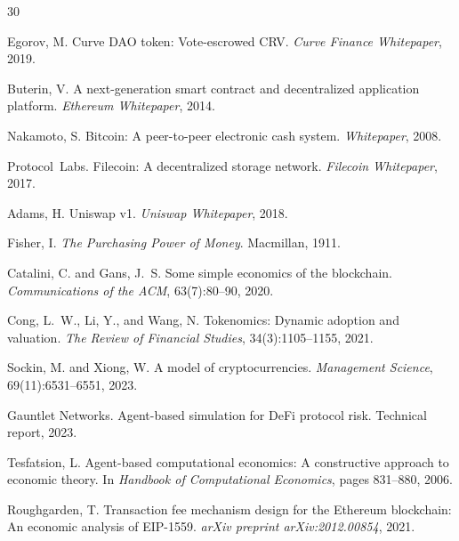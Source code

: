 \documentclass[11pt,a4paper]{article}
\begin{document}
\begin{thebibliography}{30}

Egorov, M.
\newblock Curve {DAO} token: Vote-escrowed {CRV}.
\newblock \emph{Curve Finance Whitepaper}, 2019.

Buterin, V.
\newblock A next-generation smart contract and decentralized application platform.
\newblock \emph{Ethereum Whitepaper}, 2014.

Nakamoto, S.
\newblock Bitcoin: A peer-to-peer electronic cash system.
\newblock \emph{Whitepaper}, 2008.

Protocol~Labs.
\newblock Filecoin: A decentralized storage network.
\newblock \emph{Filecoin Whitepaper}, 2017.

Adams, H.
\newblock Uniswap v1.
\newblock \emph{Uniswap Whitepaper}, 2018.

Fisher, I.
\newblock \emph{The Purchasing Power of Money}.
\newblock Macmillan, 1911.

Catalini, C. and Gans, J.~S.
\newblock Some simple economics of the blockchain.
\newblock \emph{Communications of the ACM}, 63(7):80--90, 2020.

Cong, L.~W., Li, Y., and Wang, N.
\newblock Tokenomics: Dynamic adoption and valuation.
\newblock \emph{The Review of Financial Studies}, 34(3):1105--1155, 2021.

Sockin, M. and Xiong, W.
\newblock A model of cryptocurrencies.
\newblock \emph{Management Science}, 69(11):6531--6551, 2023.

Gauntlet Networks.
\newblock Agent-based simulation for {DeFi} protocol risk.
\newblock Technical report, 2023.

Tesfatsion, L.
\newblock Agent-based computational economics: A constructive approach to economic theory.
\newblock In \emph{Handbook of Computational Economics}, pages 831--880, 2006.

Roughgarden, T.
\newblock Transaction fee mechanism design for the {Ethereum} blockchain: An economic analysis of {EIP}-1559.
\newblock \emph{arXiv preprint arXiv:2012.00854}, 2021.


\end{thebibliography}
\end{document}
